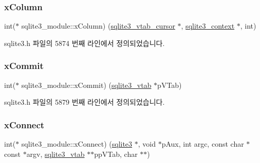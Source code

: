 \mbox{\label{structsqlite3__module_a7cde490d5d06e19b90d768b90991f4a6}} 
\subsubsection{\texorpdfstring{x\+Column}{xColumn}}
{\footnotesize\ttfamily int($\ast$ sqlite3\+\_\+module\+::x\+Column) (\hyperlink{structsqlite3__vtab__cursor}{sqlite3\+\_\+vtab\+\_\+cursor} $\ast$, \hyperlink{sqlite3_8h_a3b519553ffec8fc42b2356f5b1ebdc57}{sqlite3\+\_\+context} $\ast$, int)}



sqlite3.\+h 파일의 5874 번째 라인에서 정의되었습니다.

\mbox{\label{structsqlite3__module_a1d9fa3ed3dd16165cfcda3a532a7a3fc}} 
\subsubsection{\texorpdfstring{x\+Commit}{xCommit}}
{\footnotesize\ttfamily int($\ast$ sqlite3\+\_\+module\+::x\+Commit) (\hyperlink{structsqlite3__vtab}{sqlite3\+\_\+vtab} $\ast$p\+V\+Tab)}



sqlite3.\+h 파일의 5879 번째 라인에서 정의되었습니다.

\mbox{\label{structsqlite3__module_a457fe622b5334195640e3e835c9923a8}} 
\subsubsection{\texorpdfstring{x\+Connect}{xConnect}}
{\footnotesize\ttfamily int($\ast$ sqlite3\+\_\+module\+::x\+Connect) (\hyperlink{sqlite3_8h_a0ef6f2646262c8a9b24368d8ac140f69}{sqlite3} $\ast$, void $\ast$p\+Aux, int argc, const char $\ast$const  $\ast$argv, \hyperlink{structsqlite3__vtab}{sqlite3\+\_\+vtab} $\ast$$\ast$pp\+V\+Tab, char $\ast$$\ast$)}



